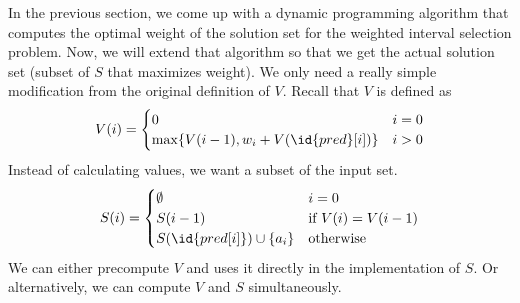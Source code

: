 In the previous section, we come up with a dynamic programming algorithm that computes the optimal weight of the solution set for the weighted interval selection problem. Now, we will extend that algorithm so that we get the actual solution set (subset of $S$ that maximizes weight). We only need a really simple modification from the original definition of $V$. Recall that $V$ is defined as
$$
V(i) = \begin{cases}
    0 & i = 0 \\
    \max \{V(i-1),w_i+V(\id{pred}[i]) \} & i > 0
\end{cases}
$$
Instead of calculating values, we want a subset of the input set.
$$
S(i) = \begin{cases}
    \emptyset & i = 0 \\
    S(i-1) & \text{if $V(i) = V(i-1)$} \\
    S(\id{pred[i]}) \cup \{ a_i \} & \text{otherwise}
\end{cases}
$$
We can either precompute $V$ and uses it directly in the implementation of $S$. Or alternatively, we can compute $V$ and $S$ simultaneously.